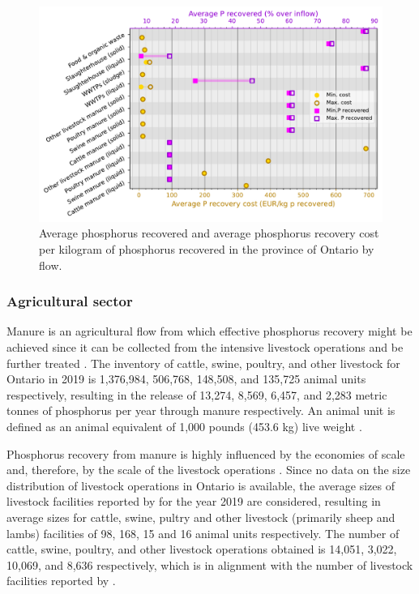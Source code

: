 \documentclass[authoryear]{elsarticle}
\begin{document}
\begin{figure}[H]
	\centering
	\includegraphics[width=0.85\linewidth, trim={0cm 0cm 0cm 0cm},clip]{Figures/Results_PlotSummarySpecific.pdf} 
	\caption{Average phosphorus recovered and average phosphorus recovery cost per kilogram of phosphorus recovered in the province of Ontario by flow.}
	\label{fig:Results_PlotSummarySpecific}
\end{figure}

\subsubsection{Agricultural sector}
Manure is an agricultural flow from which effective phosphorus recovery might be achieved since it can be collected from the intensive livestock operations and be further treated \citep{schoumans2010phosphorus}. The inventory of cattle, swine, poultry, and other livestock for Ontario in 2019 is 1,376,984, 506,768, 148,508, and 135,725 animal units respectively, resulting in the release of 13,274, 8,569, 6,457, and 2,283 metric tonnes of phosphorus per year through manure respectively. An animal unit is defined as an animal equivalent of 1,000 pounds (453.6 kg) live weight \citep{animal_unit_definition}.

Phosphorus recovery from manure is highly influenced by the economies of scale and, therefore, by the scale of the livestock operations \citep{martin2021geospatial}. Since no data on the size distribution of livestock operations in Ontario is available, the average sizes of livestock facilities reported by \citet{CAFOSAvgSize} for the year 2019 are considered, resulting in average sizes for cattle, swine, pultry and other livestock (primarily sheep and lambs) facilities of 98, 168, 15 and 16 animal units respectively. The number of cattle, swine, poultry, and other livestock operations obtained is 14,051, 3,022, 10,069, and 8,636 respectively, which is in alignment with the number of livestock facilities reported by \citet{CAFOSAvgSizeAndNumber}.
\end{document}
